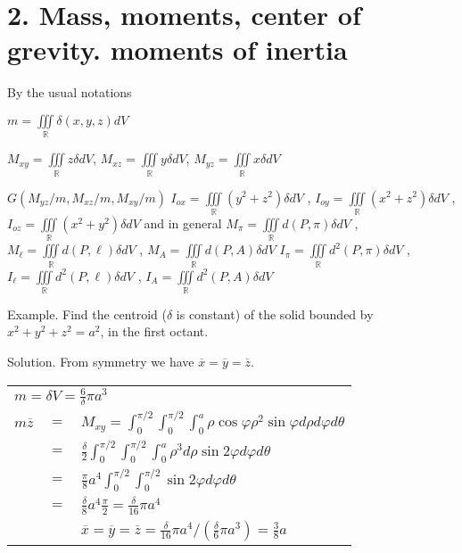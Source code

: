 \documentclass[11pt]{amsbook}
\begin{document}

\section*{2. Mass, moments, center of grevity. moments of inertia}

By the usual notations

$m=\iiint \limits_{\mathbb{R}} \delta(x,y,z)dV$

$M_{xy} = \iiint \limits_{\mathbb{R}} z \delta dV$, $M_{xz} = \iiint \limits_{\mathbb{R}} y \delta dV$, $M_{yz} = \iiint \limits_{\mathbb{R}} x \delta dV$

$G(M_{yz}/m, M_{xz}/m, M_{xy}/m)$
\newline
$I_{ox}=\iiint \limits_{\mathbb{R}} (y^2+z^2) \delta dV$ , $I_{oy}=\iiint \limits_{\mathbb{R}} (x^2+z^2) \delta dV$ , $I_{oz}=\iiint \limits_{\mathbb{R}} (x^2+y^2) \delta dV$
and in general
\newline
$M_{\pi} = \iiint \limits_{\mathbb{R}} d(P,\pi) \delta dV$ , $M_{\ell} = \iiint \limits_{\mathbb{R}} d(P,\ell) \delta dV$ , $M_{A} = \iiint \limits_{\mathbb{R}} d(P,A) \delta dV$
\newline
$I_{\pi} = \iiint \limits_{\mathbb{R}} d^2(P,\pi) \delta dV$ , $I_{\ell} = \iiint \limits_{\mathbb{R}} d^2(P,\ell) \delta dV$ , $I_{A} = \iiint \limits_{\mathbb{R}} d^2(P,A) \delta dV$

Example. Find the centroid ($\delta$ is constant) of the solid bounded by $x^2+y^2+z^2=a^2$, in the first octant.

Solution. From symmetry we have $\overline{x} = \overline{y} = \overline{z}$.

\begin{tabular}{lll}
	\multicolumn{3}{l}{$m = \delta V = \frac{6}{\delta} \pi a^3$}  \\
	$m\overline{z}$ & $=$ & $ M_{xy} = \int_{0}^{\pi/2}\int_{0}^{\pi/2}\int_{0}^{a} \rho \cos\varphi \rho^2 \sin\varphi d\rho d\varphi d\theta$ \\
	& $=$ & $ \frac{\delta}{2} \int_{0}^{\pi/2}\int_{0}^{\pi/2}\int_{0}^{a} \rho^3 d\rho \sin{2\varphi}d\varphi d\theta$ \\
	& $=$ & $ \frac{\pi}{8} a^4 \int_{0}^{\pi/2}\int_{0}^{\pi/2} \sin{2\varphi}d\varphi d\theta$ \\
	& $=$ & $ \frac{\delta}{8} a^4 \frac{\pi}{2} = \frac{\delta}{16} \pi a^4$ \\
	& & $\overline{x} = \overline{y} = \overline{z} = \frac{\delta}{16} \pi a^4 / (\frac{\delta}{6} \pi a^3) = \frac{3}{8}a$
\end{tabular}

\end{document}
